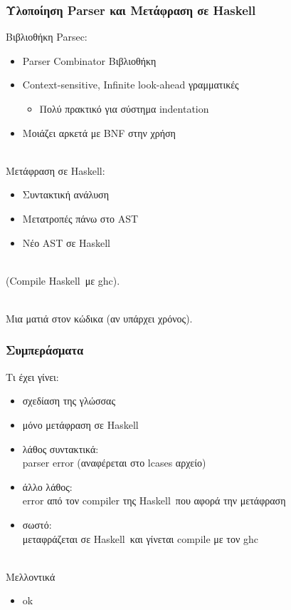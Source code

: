 \documentclass{beamer}
\def\e{\foreignlanguage{english}}
\def\h{\e{Haskell}}
\begin{document}
\begin{frame}

\frametitle{Υλοποίηση \e{Parser} και Μετάφραση σε \h}

Βιβλιοθήκη \e{Parsec}:

\begin{itemize}
\item \e{Parser Combinator} Βιβλιοθήκη
\item \e{Context-sensitive, Infinite look-ahead} γραμματικές
\begin{itemize}
\item Πολύ πρακτικό για σύστημα \e{indentation}
\end{itemize}
\item Μοιάζει αρκετά με \e{BNF} στην χρήση
\\~\
\end{itemize}

Μετάφραση σε \h:
\begin{itemize}
\item Συντακτική ανάλυση
\item Μετατροπές πάνω στο \e{AST}
\item Νέο \e{AST} σε \h
\\~\
\end{itemize}

(\e{Compile} \h\ με \e{ghc}).
\\~\

Μια ματιά στον κώδικα (αν υπάρχει χρόνος).
\end{frame}

\begin{frame}

\frametitle{Συμπεράσματα}

Τι έχει γίνει:
\begin{itemize}
\item σχεδίαση της γλώσσας

\item μόνο μετάφραση σε \h

\item λάθος συντακτικά:
\\\e{parser error} (αναφέρεται στο \e{lcases} αρχείο)

\item άλλο λάθος:
\\\e{error} από τον \e{compiler} της \h\ που αφορά την μετάφραση

\item σωστό:
\\ μεταφράζεται σε \h\ και γίνεται \e{compile} με τον \e{ghc}
\\~\

\end{itemize}

Μελλοντικά
\begin{itemize}
\item ok
\\~\

\end{itemize}

\end{frame}
\end{document}
